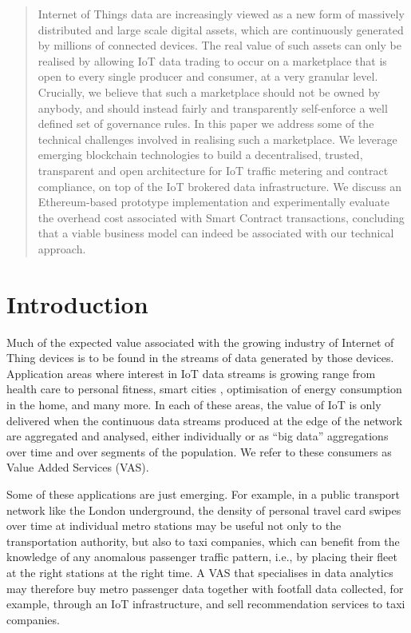 \documentclass[chi_draft]{sigchi}
\begin{document}
\begin{abstract}
Internet of Things data are increasingly viewed as a new form of massively distributed and large scale digital assets, which are continuously generated by millions of connected devices.
The real value of such assets can only be realised by allowing IoT data trading to occur on a marketplace that is open to every single producer and consumer, at a very granular level.
Crucially, we believe that such a marketplace should not be owned by anybody, and should instead fairly and transparently self-enforce a well defined set of governance rules.
In this paper we address some of the technical challenges involved in realising such a marketplace.
We leverage emerging blockchain technologies to build a decentralised, trusted, transparent and open architecture for IoT traffic metering and contract compliance, on top of the IoT brokered data infrastructure.
We discuss an Ethereum-based prototype implementation and experimentally evaluate the overhead cost associated with Smart Contract transactions, concluding that a viable business model can indeed be associated with our technical approach.
\end{abstract}

\section{Introduction}
Much of the expected value associated with the growing industry of Internet of Thing devices \cite{7004800} is to be found in the streams of data generated by those devices.
Application areas where interest in IoT data streams is growing range from health care \cite{7113786} to personal fitness, smart cities \cite{Perera2014}, optimisation of energy consumption in the home, and many more.
In each of these areas, the value of IoT is only delivered when the continuous data streams produced at the edge of the network are aggregated and analysed, either individually or as ``big data'' aggregations over time and over segments of the population.  We refer to these consumers as Value Added Services (VAS).

Some of these applications are just emerging.
For example, in a public transport network like the London underground, the density of personal travel card swipes over time at individual metro stations may be
useful not only to the transportation authority, but also to taxi companies, which can benefit from the knowledge of any anomalous passenger traffic pattern, i.e., by placing their fleet at the right stations at the right time. A VAS that specialises in data analytics may therefore buy metro passenger data together with footfall data collected, for example, through an IoT infrastructure, and sell
recommendation services to taxi companies.
\end{document}
